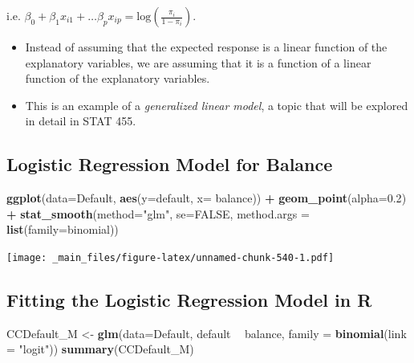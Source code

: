 \documentclass[]{book}
\newenvironment{Shaded}{\begin{snugshade}}{\end{snugshade}}
\newcommand{\KeywordTok}[1]{\textcolor[rgb]{0.13,0.29,0.53}{\textbf{#1}}}
\newcommand{\DataTypeTok}[1]{\textcolor[rgb]{0.13,0.29,0.53}{#1}}
\newcommand{\FloatTok}[1]{\textcolor[rgb]{0.00,0.00,0.81}{#1}}
\newcommand{\StringTok}[1]{\textcolor[rgb]{0.31,0.60,0.02}{#1}}
\newcommand{\OtherTok}[1]{\textcolor[rgb]{0.56,0.35,0.01}{#1}}
\newcommand{\OperatorTok}[1]{\textcolor[rgb]{0.81,0.36,0.00}{\textbf{#1}}}
\newcommand{\NormalTok}[1]{#1}
\begin{document}
i.e.
\(\beta_0+\beta_1x_{i1} + \ldots \beta_px_{ip}= \text{log}\left(\frac{\pi_i}{1-\pi_i}\right)\).

\begin{itemize}
\item
  Instead of assuming that the expected response is a linear function of
  the explanatory variables, we are assuming that it is a function of a
  linear function of the explanatory variables.
\item
  This is an example of a \emph{generalized linear model}, a topic that
  will be explored in detail in STAT 455.
\end{itemize}

\subsection{Logistic Regression Model for
Balance}\label{logistic-regression-model-for-balance}

\begin{Shaded}
\begin{Highlighting}[]
\KeywordTok{ggplot}\NormalTok{(}\DataTypeTok{data=}\NormalTok{Default, }\KeywordTok{aes}\NormalTok{(}\DataTypeTok{y=}\NormalTok{default, }\DataTypeTok{x=}\NormalTok{ balance)) }\OperatorTok{+}\StringTok{ }\KeywordTok{geom_point}\NormalTok{(}\DataTypeTok{alpha=}\FloatTok{0.2}\NormalTok{) }\OperatorTok{+}\StringTok{ }\KeywordTok{stat_smooth}\NormalTok{(}\DataTypeTok{method=}\StringTok{"glm"}\NormalTok{, }\DataTypeTok{se=}\OtherTok{FALSE}\NormalTok{, }\DataTypeTok{method.args =} \KeywordTok{list}\NormalTok{(}\DataTypeTok{family=}\NormalTok{binomial)) }
\end{Highlighting}
\end{Shaded}

\texttt{[image: \_main\_files/figure-latex/unnamed-chunk-540-1.pdf]}

\subsection{Fitting the Logistic Regression Model in
R}\label{fitting-the-logistic-regression-model-in-r}

\begin{Shaded}
\begin{Highlighting}[]
\NormalTok{CCDefault_M <-}\StringTok{ }\KeywordTok{glm}\NormalTok{(}\DataTypeTok{data=}\NormalTok{Default, default }\OperatorTok{~}\StringTok{ }\NormalTok{balance, }\DataTypeTok{family =} \KeywordTok{binomial}\NormalTok{(}\DataTypeTok{link =} \StringTok{"logit"}\NormalTok{))}
\KeywordTok{summary}\NormalTok{(CCDefault_M)}
\end{Highlighting}
\end{Shaded}
\end{document}
